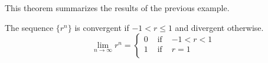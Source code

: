 \begin{frame}
This theorem summarizes the results of the previous example.
\begin{theorem}
The sequence $\{ r^n\}$ is convergent if $-1 < r \leq 1$ and divergent otherwise.
\[
\lim_{n\to\infty}r^n = \left\{ \begin{array}{lll}
0 & \textrm{ if } & -1 < r < 1\\
1 & \textrm{ if } & r = 1\\
\end{array}\right.
\]
\end{theorem}
\end{frame}
